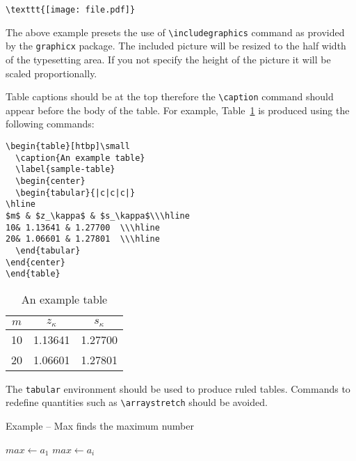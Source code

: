\documentclass{fundam}
\begin{document}
\begin{verbatim}
\texttt{[image: file.pdf]}
\end{verbatim}

The above example presets the use of \verb|\includegraphics| command
as provided by the \texttt{graphicx} package. The included picture
will be resized to the half width of the typesetting area. If you not
specify the height of the picture it will be scaled proportionally.

Table captions should be at the top therefore the \verb!\caption! command
should appear before the body of the table.
For example, Table~\ref{sample-table} is produced using the following
commands:

\begin{verbatim}
\begin{table}[htbp]\small
  \caption{An example table}
  \label{sample-table}
  \begin{center}
  \begin{tabular}{|c|c|c|}
\hline
$m$ & $z_\kappa$ & $s_\kappa$\\\hline
10& 1.13641 & 1.27700  \\\hline
20& 1.06601 & 1.27801  \\\hline
  \end{tabular}
\end{center}
\end{table}
\end{verbatim}

\begin{table}[htbp]\small
  \caption{An example table}
  \label{sample-table}
  \begin{center}
  \begin{tabular}{|c|c|c|}
\hline
$m$ & $z_\kappa$ & $s_\kappa$\\\hline
10& 1.13641 & 1.27700  \\\hline
20& 1.06601 & 1.27801  \\\hline
  \end{tabular}
\end{center}
\end{table}

The \texttt{tabular} environment should be used to produce ruled tables.
Commands to redefine quantities such as \verb!\arraystretch! should be
avoided.

\begin{algorithm}[h!] \label{ALG:1}\caption{Example -- {\sc Max} finds the maximum number}
$max \gets a_1$\;
 {
   {
    $max \gets a_i$\;
  }
}
\;

\label{algo:max}
\end{algorithm}
\end{document}
